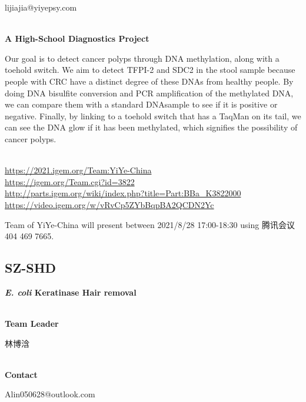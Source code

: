   lijiajia@yiyepsy.com


\textbf{\\A High-School Diagnostics Project\\}\begin{spacing}{1.5}

Our goal is to detect cancer polyps through DNA methylation, along with a toehold switch. We aim to detect TFPI-2 and SDC2 in the stool sample because people with CRC have a distinct degree of these DNAs from healthy people. By doing DNA bisulfite conversion and PCR amplification of the methylated DNA, we can compare them with a standard DNAsample to see if it is positive or negative. Finally, by linking to a toehold switch that has a TaqMan on its tail, we can see the DNA glow if it has been methylated, which signifies the possibility of cancer polyps.\end{spacing}
\\

\url{https://2021.igem.org/Team:YiYe-China }\\
\url{https://igem.org/Team.cgi?id=3822 }\\
\url{http://parts.igem.org/wiki/index.php?title=Part:BBa_K3822000 }\\
\url{https://video.igem.org/w/vRvCp5ZYbBqpBA2QCDN2Yc }\\

\vfill{}









Team of YiYe-China will present between        2021/8/28 17:00-18:30 using 腾讯会议 404 469 7665.
\newpage


\subsection{\textcolor{Blu}{ SZ-SHD } }
\vspace{5mm}
\begin{center}
\large{
  \textbf{ \textit{E. coli} Keratinase Hair removal }\\

}
\end{center}
\textbf{\\Team Leader}

  林博浛


\textbf{\\Contact}

  Alin050628@outlook.com



